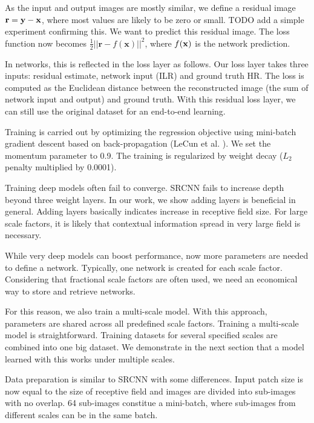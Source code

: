 \documentclass[10pt,twocolumn,letterpaper]{article}
\begin{document}
As the input and output images are mostly similar, we define a residual image ${\bf r}={\bf y}-{\bf x}$, where most values are likely to be zero or small. {\color{red}TODO add a simple experiment confirming this.} We want to predict this residual image. The loss function now becomes $\frac{1}{2}||\mathbf{r}-f(\mathbf{x})||^{2}$, where $f(\bf{x})$ is the network prediction. 

In networks, this is reflected in the loss layer as follows. 
Our loss layer takes three inputs: residual estimate, network input (ILR) and ground truth HR. The loss is computed as the Euclidean distance between the reconstructed image (the sum of network input and output) and ground truth. With this residual loss layer, we can still use the original dataset for an end-to-end learning.

Training is carried out by optimizing the regression objective using mini-batch gradient descent based on back-propagation (LeCun et al. \cite{lecun1998gradient}). We set the momentum parameter to 0.9. The training is regularized by weight decay ($L_2$ penalty multiplied by
0.0001).  

Training deep models often fail to converge. SRCNN \cite{dong2015image} fails to increase depth beyond three weight layers. In our work, we show adding layers is beneficial in general. Adding layers basically indicates increase in receptive field size. For large scale factors, it is likely that contextual information spread in very large field is necessary.

While very deep models can boost performance, now more parameters are needed to define a network. Typically, one network is created for each scale factor. Considering that fractional scale factors are often used, we need an economical way to store and retrieve networks.

For this reason, we also train a multi-scale model. With this approach, parameters are shared across all predefined scale factors. Training a multi-scale model is straightforward. Training datasets for several specified scales are combined into one big dataset. We demonstrate in the next section that a model learned with this works under multiple scales.

Data preparation is similar to SRCNN \cite{Dong2014} with some differences. Input patch size is now equal to the size of receptive field and images are divided into sub-images with no overlap. 64 sub-images constitue a mini-batch, where sub-images from different scales can be in the same batch.
\end{document}

